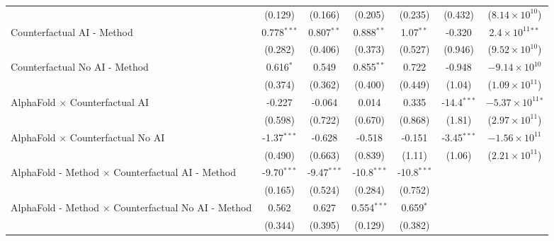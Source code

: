 \begin{tabular}{lcccccc}
                                                              & (0.129)       & (0.166)       & (0.205)       & (0.235)       & (0.432)       & ($8.14\times 10^{10}$)\\    
   Counterfactual AI - Method                                 & 0.778$^{***}$ & 0.807$^{**}$  & 0.888$^{**}$  & 1.07$^{**}$   & -0.320        & $2.4\times 10^{11}$$^{**}$\\    
                                                              & (0.282)       & (0.406)       & (0.373)       & (0.527)       & (0.946)       & ($9.52\times 10^{10}$)\\    
   Counterfactual No AI - Method                              & 0.616$^{*}$   & 0.549         & 0.855$^{**}$  & 0.722         & -0.948        & $-9.14\times 10^{10}$\\    
                                                              & (0.374)       & (0.362)       & (0.400)       & (0.449)       & (1.04)        & ($1.09\times 10^{11}$)\\    
   AlphaFold $\times$ Counterfactual AI                       & -0.227        & -0.064        & 0.014         & 0.335         & -14.4$^{***}$ & $-5.37\times 10^{11}$$^{*}$\\    
                                                              & (0.598)       & (0.722)       & (0.670)       & (0.868)       & (1.81)        & ($2.97\times 10^{11}$)\\    
   AlphaFold $\times$ Counterfactual No AI                    & -1.37$^{***}$ & -0.628        & -0.518        & -0.151        & -3.45$^{***}$ & $-1.56\times 10^{11}$\\    
                                                              & (0.490)       & (0.663)       & (0.839)       & (1.11)        & (1.06)        & ($2.21\times 10^{11}$)\\    
   AlphaFold - Method $\times$ Counterfactual AI - Method     & -9.70$^{***}$ & -9.47$^{***}$ & -10.8$^{***}$ & -10.8$^{***}$ &               &   \\   
                                                              & (0.165)       & (0.524)       & (0.284)       & (0.752)       &               &   \\   
   AlphaFold - Method $\times$ Counterfactual No AI - Method  & 0.562         & 0.627         & 0.554$^{***}$ & 0.659$^{*}$   &               &   \\   
                                                              & (0.344)       & (0.395)       & (0.129)       & (0.382)       &               &   \\   

\end{tabular}
